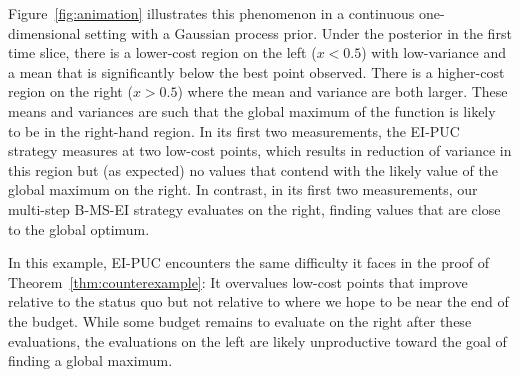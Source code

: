 


Figure~\ref{fig:animation} illustrates this phenomenon in a continuous one-dimensional setting with a Gaussian process prior. Under the posterior in the first time slice, there is a lower-cost region on the left ($x < 0.5$) with low-variance and a mean that is significantly below the best point observed. There is a higher-cost region on the right ($x>0.5$) where the mean and variance are both larger. These means and variances are such that the global maximum of the function is likely to be in the right-hand region. In its first two measurements, the EI-PUC strategy measures at two low-cost points, which results in reduction of variance in this region but (as expected) no values that contend with the likely value of the global maximum on the right. In contrast, in its first two measurements, our multi-step B-MS-EI strategy evaluates on the right, finding values that are close to the global optimum.

 In this example, EI-PUC encounters the same difficulty it faces in the proof of Theorem~\ref{thm:counterexample}:  It overvalues low-cost points that improve relative to the status quo but not relative to where we hope to be near the end of the budget. While some budget remains to evaluate on the right after these evaluations, the evaluations on the left are likely unproductive toward the goal of finding a global maximum. 

